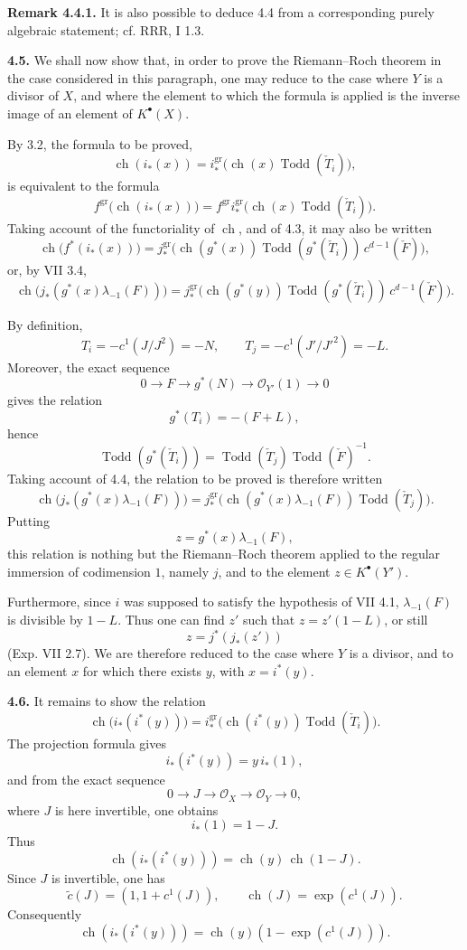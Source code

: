 \documentclass[11pt]{article}
\newcommand{\ch}{\operatorname{ch}}
\newcommand{\Todd}{\operatorname{Todd}}
\newcommand{\RRR}{\mathrm{RRR}}
\providecommand{\ch}{\operatorname{ch}}
\providecommand{\Todd}{\operatorname{Todd}}
\begin{document}
\textbf{Remark 4.4.1.} It is also possible to deduce 4.4 from a corresponding purely algebraic statement; cf. \(\RRR\), I 1.3.

\textbf{4.5.} We shall now show that, in order to prove the Riemann--Roch theorem in the case considered in this paragraph, one may reduce to the case where \(Y\) is a divisor of \(X\), and where the element to which the formula is applied is the inverse image of an element of \(K^{\bullet}(X)\).

By 3.2, the formula to be proved,
\[
 \ch(i_*(x))=
 i^{\mathrm{gr}}_*\bigl(\ch(x)\Todd(\check T_i)\bigr),
\]
is equivalent to the formula
\[
 f^{\mathrm{gr}}\bigl(\ch(i_*(x))\bigr)
 =
 f^{\mathrm{gr}}i^{\mathrm{gr}}_*\bigl(\ch(x)\Todd(\check T_i)\bigr).
\]
Taking account of the functoriality of \(\ch\), and of 4.3, it may also be written
\[
 \ch\bigl(f^*(i_*(x))\bigr)
 =
 j^{\mathrm{gr}}_*\bigl(\ch(g^*(x))\Todd(g^*(\check T_i))\,c^{d-1}(\check F)\bigr),
\]
or, by VII 3.4,
\[
 \ch\bigl(j_*(g^*(x)\lambda_{-1}(F))\bigr)
 =
 j^{\mathrm{gr}}_*\bigl(\ch(g^*(y))\Todd(g^*(\check T_i))\,c^{d-1}(\check F)\bigr).
\]

By definition,
\[
 T_i=-c^1(J/J^2)=-N,\qquad
 T_j=-c^1(J'/J'^2)=-L.
\]
Moreover, the exact sequence
\[
0\longrightarrow F\longrightarrow g^*(N)\longrightarrow \mathcal O_{Y'}(1)\longrightarrow0
\]
gives the relation
\[
 g^*(T_i)=-(F+L),
\]
hence
\[
 \Todd(g^*(\check T_i))=\Todd(\check T_j)\Todd(\check F)^{-1}.
\]
Taking account of 4.4, the relation to be proved is therefore written
\[
 \ch\bigl(j_*(g^*(x)\lambda_{-1}(F))\bigr)
 =
 j^{\mathrm{gr}}_*\bigl(\ch(g^*(x)\lambda_{-1}(F))\Todd(\check T_j)\bigr).
\]
Putting
\[
z=g^*(x)\lambda_{-1}(F),
\]
this relation is nothing but the Riemann--Roch theorem applied to the regular immersion of codimension \(1\), namely \(j\), and to the element \(z\in K^{\bullet}(Y')\).

Furthermore, since \(i\) was supposed to satisfy the hypothesis of VII 4.1, \(\lambda_{-1}(F)\) is divisible by \(1-L\). Thus one can find \(z'\) such that \(z=z'(1-L)\), or still
\[
 z=j^*(j_*(z'))
\]
(Exp. VII 2.7). We are therefore reduced to the case where \(Y\) is a divisor, and to an element \(x\) for which there exists \(y\), with \(x=i^*(y)\).

\textbf{4.6.} It remains to show the relation
\[
 \ch\bigl(i_*(i^*(y))\bigr)
 =
 i^{\mathrm{gr}}_*\bigl(\ch(i^*(y))\Todd(\check T_i)\bigr).
\]
The projection formula gives
\[
 i_*(i^*(y))=y\,i_*(1),
\]
and from the exact sequence
\[
0\longrightarrow J\longrightarrow\mathcal O_X\longrightarrow\mathcal O_Y\longrightarrow0,
\]
where \(J\) is here invertible, one obtains
\[
 i_*(1)=1-J.
\]
Thus
\[
 \ch(i_*(i^*(y)))=\ch(y)\,\ch(1-J).
\]
Since \(J\) is invertible, one has
\[
 \widetilde c(J)=(1,1+c^1(J)),\qquad \ch(J)=\exp(c^1(J)).
\]
Consequently
\[
 \ch(i_*(i^*(y)))=\ch(y)(1-\exp(c^1(J))).
\]
\end{document}
